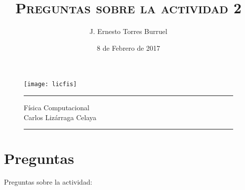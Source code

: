 \documentclass{article}
\title{\huge \textbf{\textsc{Preguntas sobre la actividad 2}}}
\author{J. Ernesto Torres Burruel}
\date{8 de Febrero de 2017}
\begin{document}
\begin{titlepage}%

\begin{figure}[h!]
    \centering
    \texttt{[image: licfis]}
    \\[2 cm]
    \hrule
    \maketitle
    {\Large Física Computacional\\Carlos Lizárraga Celaya}
    \bigskip
    \hrule
    \thispagestyle{empty}
\end{figure}

\end{titlepage}

\newpage

\section*{Preguntas}
Preguntas sobre la actividad:
\end{document}
